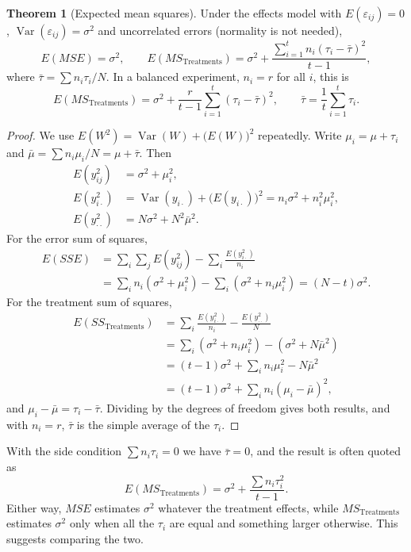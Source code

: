 \documentclass[11pt,a4paper]{article}
\numberwithin{equation}{section}
\DeclareMathOperator{\Var}{Var}
\theoremstyle{definition}
\newtheorem{thm}{Theorem}[subsection]
\begin{document}
\begin{thm}[Expected mean squares]\label{thm:ems-one-way}
Under the effects model with $E(\varepsilon_{ij}) = 0$, $\Var(\varepsilon_{ij}) = \sigma^2$ and uncorrelated errors (normality is not needed),
\[
E(MSE) = \sigma^2 , \qquad E(MS_{\mathrm{Treatments}}) = \sigma^2 + \frac{\sum_{i=1}^tn_i(\tau_i - \bar\tau)^2}{t - 1} ,
\]
where $\bar\tau = \sum n_i\tau_i/N$. In a balanced experiment, $n_i = r$ for all $i$, this is
\[
E(MS_{\mathrm{Treatments}}) = \sigma^2 + \frac{r}{t - 1}\sum_{i=1}^t(\tau_i - \bar\tau)^2 , \qquad \bar\tau = \frac1t\sum_{i=1}^t\tau_i .
\]
\end{thm}

\begin{proof}
We use $E(W^2) = \Var(W) + \bigl(E(W)\bigr)^2$ repeatedly. Write $\mu_i = \mu + \tau_i$ and $\bar\mu = \sum n_i\mu_i/N = \mu + \bar\tau$. Then
\begin{align*}
E(y_{ij}^2) &= \sigma^2 + \mu_i^2 , \\
E(y_{i\cdot}^2) &= \Var(y_{i\cdot}) + \bigl(E(y_{i\cdot})\bigr)^2 = n_i\sigma^2 + n_i^2\mu_i^2 , \\
E(y_{\cdot\cdot}^2) &= N\sigma^2 + N^2\bar\mu^2 .
\end{align*}
For the error sum of squares,
\begin{align*}
E(SSE) &= \sum_i\sum_jE(y_{ij}^2) - \sum_i\frac{E(y_{i\cdot}^2)}{n_i} \\
&= \sum_in_i(\sigma^2 + \mu_i^2) - \sum_i(\sigma^2 + n_i\mu_i^2) = (N - t)\sigma^2 .
\end{align*}
For the treatment sum of squares,
\begin{align*}
E(SS_{\mathrm{Treatments}}) &= \sum_i\frac{E(y_{i\cdot}^2)}{n_i} - \frac{E(y_{\cdot\cdot}^2)}{N} \\
&= \sum_i(\sigma^2 + n_i\mu_i^2) - (\sigma^2 + N\bar\mu^2) \\
&= (t - 1)\sigma^2 + \sum_in_i\mu_i^2 - N\bar\mu^2 \\
&= (t - 1)\sigma^2 + \sum_in_i(\mu_i - \bar\mu)^2 ,
\end{align*}
and $\mu_i - \bar\mu = \tau_i - \bar\tau$. Dividing by the degrees of freedom gives both results, and with $n_i = r$, $\bar\tau$ is the simple average of the $\tau_i$.
\end{proof}

With the side condition $\sum n_i\tau_i = 0$ we have $\bar\tau = 0$, and the result is often quoted as
\[
E(MS_{\mathrm{Treatments}}) = \sigma^2 + \frac{\sum n_i\tau_i^2}{t - 1} .
\] Either way, $MSE$
estimates $\sigma^2$ whatever the treatment effects, while $MS_{\mathrm{Treatments}}$ estimates $\sigma^2$ only when all the $\tau_i$ are equal and something larger
otherwise. This suggests comparing the two.
\end{document}
